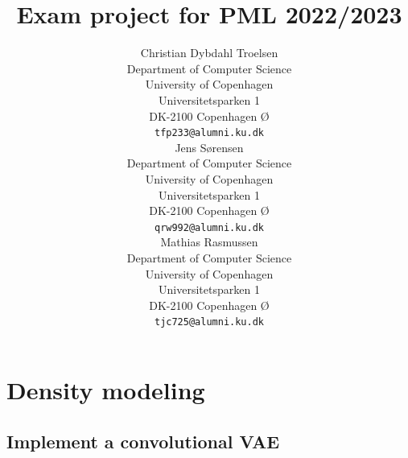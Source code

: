 

\title{Exam project for PML 2022/2023}

\author{ 
	{Christian Dybdahl Troelsen} \\
	Department of Computer Science\\
	University of Copenhagen\\
	Universitetsparken 1 \\
    DK-2100 Copenhagen Ø \\
	\texttt{tfp233@alumni.ku.dk} \\
	\And
	{Jens Sørensen} \\
	Department of Computer Science\\
	University of Copenhagen\\
	Universitetsparken 1 \\
    DK-2100 Copenhagen Ø \\
	\texttt{qrw992@alumni.ku.dk} \\
	\And
	{Mathias Rasmussen} \\
	Department of Computer Science\\
	University of Copenhagen\\
	Universitetsparken 1 \\
    DK-2100 Copenhagen Ø \\
	\texttt{tjc725@alumni.ku.dk} \\
}

\renewcommand{\headeright}{Report}
\renewcommand{\undertitle}{Report}

\renewcommand{\shorttitle}{PML Report}



\maketitle
\section{Density modeling}
\subsection{Implement a convolutional VAE}
